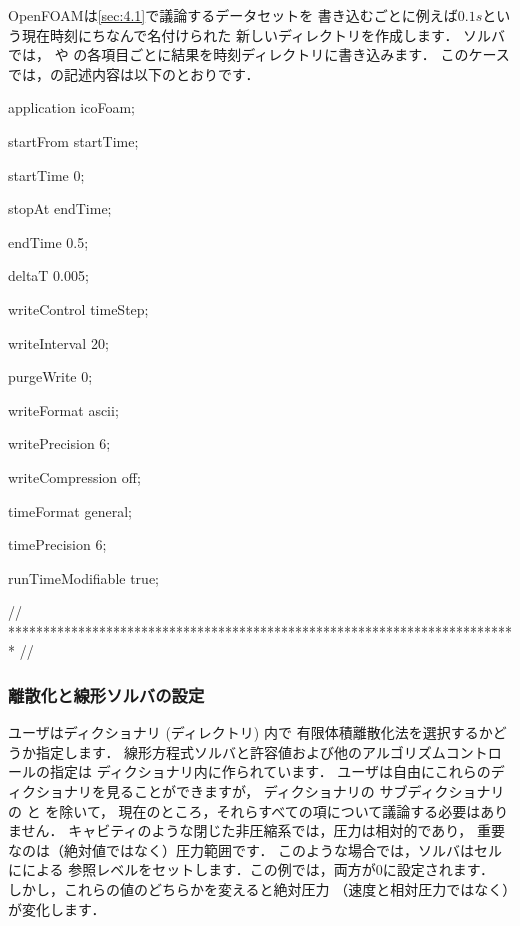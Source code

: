 OpenFOAMは\autoref{sec:4.1}で議論するデータセットを
書き込むごとに例えば$0.1\unit{s}$という現在時刻にちなんで名付けられた
新しいディレクトリを作成します．
%
%
ソルバでは，
%
%
や
%
%
の各項目ごとに結果を時刻ディレクトリに書き込みます．
このケースでは，の記述内容は以下のとおりです．
\begin{OFverbatim}[file, linenum=17]

application     icoFoam;

startFrom       startTime;

startTime       0;

stopAt          endTime;

endTime         0.5;

deltaT          0.005;

writeControl    timeStep;

writeInterval   20;

purgeWrite      0;

writeFormat     ascii;

writePrecision  6;

writeCompression off;

timeFormat      general;

timePrecision   6;

runTimeModifiable true;


// ************************************************************************* //
\end{OFverbatim}

\subsubsection{離散化と線形ソルバの設定}
\label{sssec:2.1.1.5}
ユーザはディクショナリ (ディレクトリ) 内で
有限体積離散化法を選択するかどうか指定します．
線形方程式ソルバと許容値および他のアルゴリズムコントロールの指定は
ディクショナリ内に作られています．
ユーザは自由にこれらのディクショナリを見ることができますが，
ディクショナリの
%
%
サブディクショナリの
%
%
と
%
%
を除いて，
現在のところ，それらすべての項について議論する必要はありません．
キャビティのような閉じた非圧縮系では，圧力は相対的であり，
重要なのは（絶対値ではなく）圧力範囲です．
このような場合では，ソルバはセルにによる
参照レベルをセットします．この例では，両方が0に設定されます．
しかし，これらの値のどちらかを変えると絶対圧力
（速度と相対圧力ではなく）が変化します．


